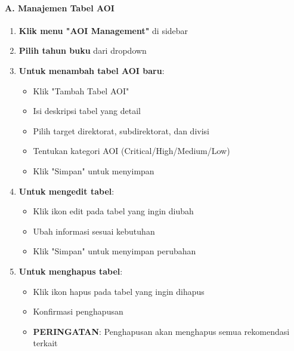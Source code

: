 \documentclass[12pt,a4paper]{article}
\begin{document}
\paragraph{A. Manajemen Tabel AOI}
\begin{enumerate}
\item \textbf{Klik menu "AOI Management"} di sidebar
\item \textbf{Pilih tahun buku} dari dropdown
\item \textbf{Untuk menambah tabel AOI baru}:
\begin{itemize}
\item Klik "Tambah Tabel AOI"
\item Isi deskripsi tabel yang detail
\item Pilih target direktorat, subdirektorat, dan divisi
\item Tentukan kategori AOI (Critical/High/Medium/Low)
\item Klik "Simpan" untuk menyimpan
\end{itemize}
\item \textbf{Untuk mengedit tabel}:
\begin{itemize}
\item Klik ikon edit pada tabel yang ingin diubah
\item Ubah informasi sesuai kebutuhan
\item Klik "Simpan" untuk menyimpan perubahan
\end{itemize}
\item \textbf{Untuk menghapus tabel}:
\begin{itemize}
\item Klik ikon hapus pada tabel yang ingin dihapus
\item Konfirmasi penghapusan
\item \textbf{PERINGATAN}: Penghapusan akan menghapus semua rekomendasi terkait
\end{itemize}
\end{enumerate}
\end{document}
